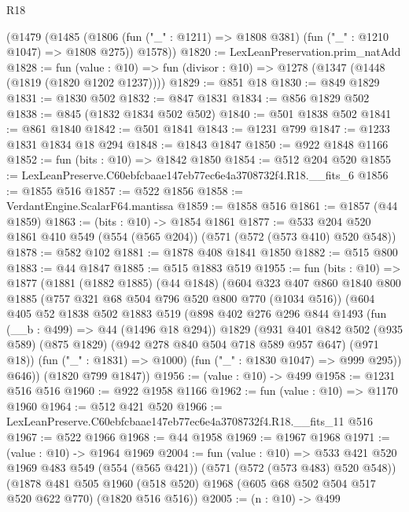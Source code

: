 \begin{lexlean}{R18}
\begin{coremodule}
    (@1479
      (@1485
        (@1806 (fun ("_" : @1211) => @1808 @381) (fun ("_" : @1210 @1047) => @1808 @275))
        @1578))
@1820 := LexLeanPreservation.prim_natAdd
@1828 := fun (value : @10) =>
  fun (divisor : @10) => @1278 (@1347 (@1448 (@1819 (@1820 @1202 @1237))))
@1829 := @851 @18
@1830 := @849 @1829
@1831 := @1830 @502
@1832 := @847 @1831
@1834 := @856 @1829 @502
@1838 := @845 (@1832 @1834 @502 @502)
@1840 := @501 @1838 @502
@1841 := @861 @1840
@1842 := @501 @1841
@1843 := @1231 @799
@1847 := @1233 @1831 @1834 @18 @294
@1848 := @1843 @1847
@1850 := @922 @1848 @1166
@1852 := fun (bits : @10) => @1842 @1850
@1854 := @512 @204 @520
@1855 := LexLeanPreserve.C60ebfcbaae147eb77ec6e4a3708732f4.R18.__fits_6
@1856 := @1855 @516
@1857 := @522 @1856
@1858 := VerdantEngine.ScalarF64.mantissa
@1859 := @1858 @516
@1861 := @1857 (@44 @1859)
@1863 := (bits : @10) -> @1854 @1861
@1877 := @533 @204 @520 @1861 @410 @549 (@554 (@565 @204)) (@571 (@572 (@573 @410) @520 @548))
@1878 := @582 @102
@1881 := @1878 @408 @1841 @1850
@1882 := @515 @800
@1883 := @44 @1847
@1885 := @515 @1883 @519
@1955 := fun (bits : @10) =>
  @1877
    (@1881
      (@1882 @1885)
      (@44 @1848)
      (@604
        @323
        @407
        @860
        @1840
        @800
        @1885
        (@757 @321 @68 @504 @796 @520 @800 @770 (@1034 @516))
        (@604
          @405
          @52
          @1838
          @502
          @1883
          @519
          (@898
            @402
            @276
            @296
            @844
            @1493
            (fun (__b : @499) => @44 (@1496 @18 @294))
            @1829
            (@931
              @401
              @842
              @502
              (@935 @589)
              (@875 @1829)
              (@942 @278 @840 @504 @718 @589 @957 @647)
              (@971 @18))
            (fun ("_" : @1831) => @1000)
            (fun ("_" : @1830 @1047) => @999 @295))
          @646))
      (@1820 @799 @1847))
@1956 := (value : @10) -> @499
@1958 := @1231 @516 @516
@1960 := @922 @1958 @1166
@1962 := fun (value : @10) => @1170 @1960
@1964 := @512 @421 @520
@1966 := LexLeanPreserve.C60ebfcbaae147eb77ec6e4a3708732f4.R18.__fits_11 @516
@1967 := @522 @1966
@1968 := @44 @1958
@1969 := @1967 @1968
@1971 := (value : @10) -> @1964 @1969
@2004 := fun (value : @10) =>
  @533
    @421
    @520
    @1969
    @483
    @549
    (@554 (@565 @421))
    (@571 (@572 (@573 @483) @520 @548))
    (@1878
      @481
      @505
      @1960
      (@518 @520)
      @1968
      (@605 @68 @502 @504 @517 @520 @622 @770)
      (@1820 @516 @516))
@2005 := (n : @10) -> @499

\end{coremodule}
\end{lexlean}
